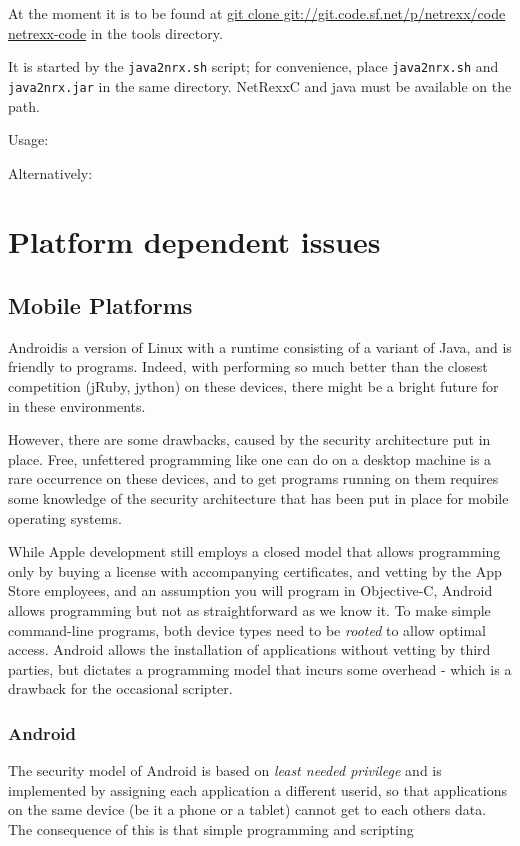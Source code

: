 {At the moment it is to be found at \url{git clone git://git.code.sf.net/p/netrexx/code netrexx-code} in the tools directory.

It is started by the \texttt{java2nrx.sh} script; for convenience, place \texttt{java2nrx.sh} and \texttt{java2nrx.jar} in the
same directory. NetRexxC and java must be available on the path.

Usage:

Alternatively:


\chapter{Platform dependent issues}
\section{Mobile Platforms}
Android\texttrademark is a version of Linux with a runtime consisting
of a variant of Java, and is friendly to \nr{}
programs. Indeed, with \nr{} performing so much better than the closest
competition (jRuby, jython) on these devices, there might be a bright
future for \nr{} in these environments. 

However, there are some drawbacks, caused by the security architecture
put in place. Free, unfettered programming like one can do on a
desktop machine is a rare occurrence on these devices, and to get
programs running on them requires some knowledge of the security
architecture that has been put in place for mobile operating systems.

While Apple development still employs a closed model that allows programming only by
buying a license with accompanying certificates, and vetting by the
App Store employees, and an assumption you will program in
Objective-C, Android allows programming but not as straightforward as
we know it. To make simple command-line \nr{} programs, both device
types need to be \emph{rooted} to allow optimal access. Android allows
the installation of applications without vetting by third parties, but
dictates a programming model that incurs some overhead - which is a
drawback for the occasional scripter.
\subsection{Android}
The security model of Android is based on \emph{least needed
  privilege} and is implemented by assigning each application a
different userid, so that applications on the same device (be it a
phone or a tablet) cannot get to each others data. The consequence of
this is that simple \nr{} programming and scripting 
}
